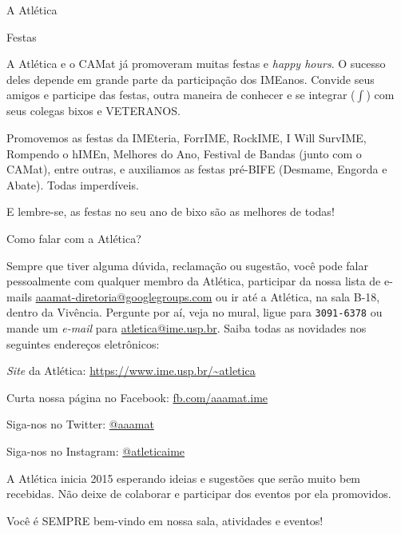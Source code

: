 \begin{secao}{A Atlética}
\begin{subsecao}{Festas}

A Atlética e o CAMat já promoveram muitas festas e \textit{happy hours}. O sucesso
deles depende em grande parte da participação dos IMEanos. Convide seus
amigos e participe das festas, outra maneira de conhecer e se
integrar ($\int$) com seus colegas bixos e VETERANOS.

Promovemos as festas da IMEteria, ForrIME, RockIME, I Will SurvIME, Rompendo o hIMEn,
Melhores do Ano, Festival de Bandas (junto com o CAMat), entre outras, e
auxiliamos as festas pré-BIFE (Desmame, Engorda e Abate). Todas imperdíveis.

E lembre-se, as festas no seu ano de bixo são as melhores de todas!

\end{subsecao}

\begin{subsecao}{Como falar com a Atlética?}

Sempre que tiver alguma dúvida, reclamação ou sugestão, você pode falar
pessoalmente com qualquer membro da Atlética, participar da nossa lista de e-mails \url{aaamat-diretoria@googlegroups.com} ou ir até a Atlética, na sala
B-18, dentro da Vivência.  Pergunte por aí, veja no mural, ligue para {\tt 3091-6378} ou mande um \textit{e-mail} para \url{atletica@ime.usp.br}.
Saiba todas as novidades nos seguintes endereços eletrônicos:

\textit{Site} da Atlética: \url{https://www.ime.usp.br/~atletica}

Curta nossa página no Facebook: \url{fb.com/aaamat.ime}

Siga-nos no Twitter: \url{@aaamat}

Siga-nos no Instagram: \url{@atleticaime}

A Atlética inicia 2015 esperando ideias e sugestões que serão muito bem %
recebidas. Não deixe de colaborar e participar dos eventos por ela promovidos.

Você é SEMPRE bem-vindo em nossa sala, atividades e eventos!

\end{subsecao}
\end{secao}
